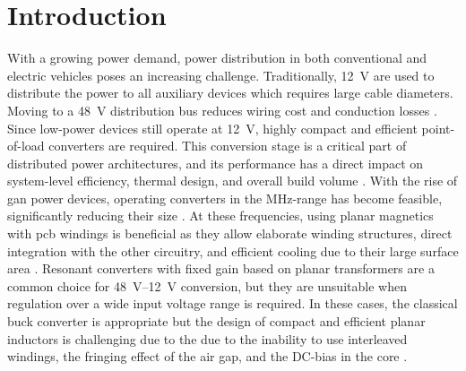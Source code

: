 \documentclass{IPEC2026TEC}
\newcommand{\ac}{\gls}
\begin{document}
\section{Introduction}
With a growing power demand, power distribution in both conventional and electric vehicles poses an increasing challenge. Traditionally, \qty{12}{\V} are used to distribute the power to all auxiliary devices which requires large cable diameters. Moving to a \qty{48}{\V} distribution bus reduces wiring cost and conduction losses \cite{kumawatComprehensiveStudyAutomotive2019}. Since low-power devices still operate at \qty{12}{\V}, highly compact and efficient point-of-load converters are required. This conversion stage is a critical part of distributed power architectures, and its performance has a direct impact on system-level efficiency, thermal design, and overall build volume \cite{kumawatComprehensiveStudyAutomotive2019}. With the rise of \ac{gan} power devices, operating converters in the MHz-range has become feasible, significantly reducing their size \cite{weitzHighFrequencyResonant2023}. 
At these frequencies, using planar magnetics with \ac{pcb} windings is beneficial as they allow elaborate winding structures, direct integration with the other circuitry, and efficient cooling due to their large surface area \cite{wangPCBWindingBasedCoupled2023, liHighFrequencyHigh2018, schaferNovelHighlyEfficient2020, caiOptimalDesignMegahertz2020}. 
Resonant converters with fixed gain based on planar transformers are a common choice for \qtyrange{48}{12}{\V} conversion, but they are unsuitable when regulation over a wide input voltage range is required. In these cases, the classical buck converter is appropriate but the design of compact and efficient planar inductors is challenging due to the due to the inability to use interleaved windings, the fringing effect of the air gap, and the DC-bias in the core \cite{ouyangOverviewPlanarMagnetic2014a, liuHighPowerDensity2025, saadatizadehDesignOptimizationMethod2024, zhengOptimizationParallelStructure2020}. \par
\end{document}
